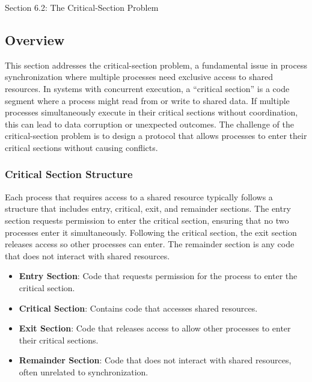 \begin{notes}{Section 6.2: The Critical-Section Problem}
    \subsection*{Overview}

    This section addresses the critical-section problem, a fundamental issue in process synchronization where multiple processes need exclusive access to shared resources. In systems with concurrent 
    execution, a “critical section” is a code segment where a process might read from or write to shared data. If multiple processes simultaneously execute in their critical sections without 
    coordination, this can lead to data corruption or unexpected outcomes. The challenge of the critical-section problem is to design a protocol that allows processes to enter their critical sections 
    without causing conflicts.
    
    \subsubsection*{Critical Section Structure}
    
    Each process that requires access to a shared resource typically follows a structure that includes entry, critical, exit, and remainder sections. The entry section requests permission to enter the 
    critical section, ensuring that no two processes enter it simultaneously. Following the critical section, the exit section releases access so other processes can enter. The remainder section is 
    any code that does not interact with shared resources.
    
    \begin{highlight}
    
        \begin{itemize}
            \item \textbf{Entry Section}: Code that requests permission for the process to enter the critical section.
            \item \textbf{Critical Section}: Contains code that accesses shared resources.
            \item \textbf{Exit Section}: Code that releases access to allow other processes to enter their critical sections.
            \item \textbf{Remainder Section}: Code that does not interact with shared resources, often unrelated to synchronization.
        \end{itemize}
    

\end{highlight}
\end{notes}
